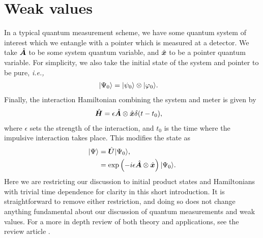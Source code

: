 \section{Weak values}
In a typical quantum measurement scheme, we have some quantum system of interest which we entangle with a pointer which is measured at a detector.  We take $\hat{\bm A}$ to be some system quantum variable, and $\hat{\bm x}$ to be a pointer quantum variable.  For simplicity, we also take the initial state of the system and pointer to be pure, \emph{i.e.,}
\begin{align}
  \lvert \Psi_0\rangle &= \lvert \psi_0\rangle \otimes \lvert \varphi_0\rangle.
\end{align}
Finally, the interaction Hamiltonian combining the system and meter is given by
\begin{align}
  \hat{\bm H} &= \epsilon \hat{\bm A} \otimes \hat{\bm x} \delta{(t - t_0)},
\end{align}
where $\epsilon$ sets the strength of the interaction, and $t_0$ is the time where the impulsive interaction takes place.  This modifies the state as
\begin{align}
\nonumber  \lvert \Psi\rangle &= \hat{\bm U}\lvert \Psi_0\rangle, \\
                      &= \exp\left(-i\epsilon \hat{\bm A} \otimes \hat{\bm x} \right) \lvert \Psi_0\rangle.
\end{align}
Here we are restricting our discussion to initial product states and Hamiltonians with trivial time dependence for clarity in this short introduction.  It is straightforward to remove either restriction, and doing so does not change anything fundamental about our discussion of quantum measurements and weak values.  For a more in depth review of both theory and applications, see the review article \cite{Dressel2014}.

